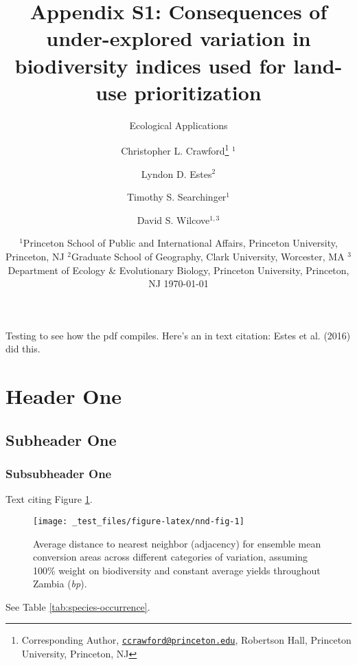 \documentclass[
]{article}
\title{Appendix S1: Consequences of under-explored variation in biodiversity indices used for land-use prioritization}
\subtitle{Ecological Applications}
\author{Christopher L. Crawford\footnote{Corresponding Author, \href{mailto:ccrawford@princeton.edu}{\nolinkurl{ccrawford@princeton.edu}}, Robertson Hall, Princeton University, Princeton, NJ} \(^1\) \and Lyndon D. Estes\(^2\) \and Timothy S. Searchinger\(^1\) \and David S. Wilcove\(^{1, 3}\)}
\date{\(^1\)Princeton School of Public and International Affairs, Princeton University, Princeton, NJ \newline \(^2\)Graduate School of Geography, Clark University, Worcester, MA \newline \(^3\)Department of Ecology \& Evolutionary Biology, Princeton University, Princeton, NJ \newline \newline \newline \today}
\begin{document}
\maketitle

{
\setcounter{tocdepth}{2}
\tableofcontents
}
\renewcommand{\thefigure}{S\arabic{figure}}
\renewcommand{\thesection}{S\arabic{section}}
\renewcommand{\thetable}{S\arabic{table}}
\renewcommand\theequation{S\arabic{equation}}

\listoffigures
\listoftables

Testing to see how the pdf compiles. Here's an in text citation: Estes et al. (2016) did this.

\hypertarget{header-one}{%
\section{Header One}\label{header-one}}

\hypertarget{subheader-one}{%
\subsection{Subheader One}\label{subheader-one}}

\hypertarget{subsubheader-one}{%
\subsubsection{Subsubheader One}\label{subsubheader-one}}

Text citing Figure \ref{fig:nnd-fig}.



\begin{figure}
\texttt{[image: \_test\_files/figure-latex/nnd-fig-1]} \caption{Average distance to nearest neighbor (adjacency) for ensemble mean conversion areas across different categories of variation, assuming 100\% weight on biodiversity and constant average yields throughout Zambia (\emph{bp}).}\label{fig:nnd-fig}
\end{figure}

See Table \ref{tab:species-occurrence}.
\end{document}
